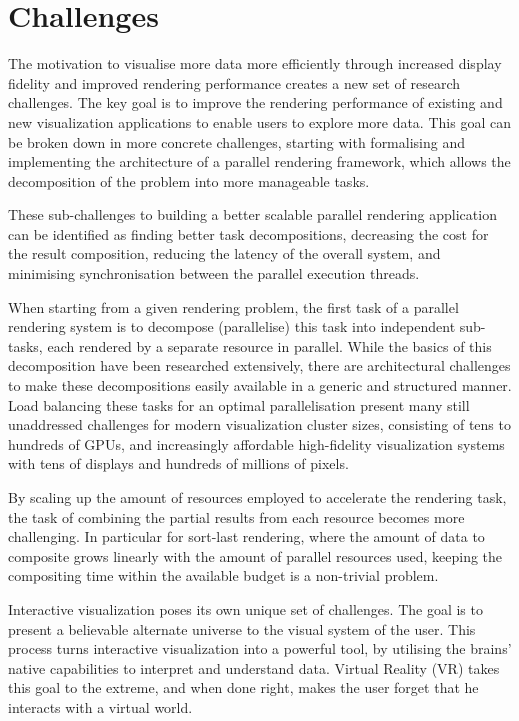 \section{Challenges}

The motivation to visualise more data more efficiently through increased
display fidelity and improved rendering performance creates a new set of
research challenges. The key goal is to improve the rendering performance of
existing and new visualization applications to enable users to explore more
data. This goal can be broken down in more concrete challenges, starting with
formalising and implementing the architecture of a parallel rendering
framework, which allows the decomposition of the problem into more manageable tasks.

These sub-challenges to building a better scalable parallel rendering application
can be identified as finding better task decompositions, decreasing the cost
for the result composition, reducing the latency of the overall system, and
minimising synchronisation between the parallel execution threads.

When starting from a given rendering problem, the first task of a parallel
rendering system is to decompose (parallelise) this task into independent
sub-tasks, each rendered by a separate resource in parallel. While the basics
of this decomposition have been researched extensively, there are architectural
challenges to make these decompositions easily available in a generic and
structured manner. Load balancing these tasks for an optimal
parallelisation present many still unaddressed challenges for modern
visualization cluster sizes, consisting of tens to hundreds of GPUs, and increasingly
affordable high-fidelity visualization systems with tens of displays and
hundreds of millions of pixels.

By scaling up the amount of resources employed to accelerate the
rendering task, the task of combining the partial results from each resource
becomes more challenging. In particular for sort-last rendering, where the
amount of data to composite grows linearly with the amount of parallel resources
used, keeping the compositing time within the available budget is a non-trivial
problem.

Interactive visualization poses its own unique set of challenges. The goal is to
present a believable alternate universe to the visual system of the user. This
process turns interactive visualization into a powerful tool, by utilising
the brains' native capabilities to interpret and understand data. Virtual
Reality (VR) takes this goal to the extreme, and when done right, makes the user
forget that he interacts with a virtual world.

